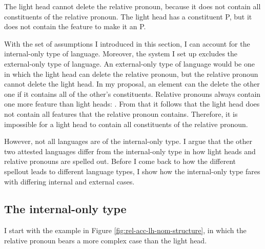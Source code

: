 The light head cannot delete the relative pronoun, because it does not contain all constituents of the relative pronoun.
The light head has a constituent P, but it does not contain the feature  to make it an P.

With the set of assumptions I introduced in this section, I can account for the internal-only type of language. Moreover, the system I set up excludes the external-only type of language. An external-only type of language would be one in which the light head can delete the relative pronoun, but the relative pronoun cannot delete the light head. In my proposal, an element can the delete the other one if it contains all of the other's constituents. Relative pronouns always contain one more feature than light heads: . From that it follows that the light head does not contain all features that the relative pronoun contains. Therefore, it is impossible for a light head to contain all constituents of the relative pronoun.

However, not all languages are of the internal-only type. I argue that the other two attested languages differ from the internal-only type in how light heads and relative pronouns are spelled out. Before I come back to how the different spellout leads to different language types, I show how the internal-only type fares with differing internal and external cases.


\subsection{The internal-only type}

I start with the example in Figure \ref{fig:rel-acc-lh-nom-structure}, in which the relative pronoun bears a more complex case than the light head.

